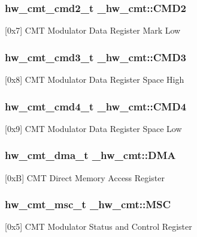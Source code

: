 \subsubsection[{\texorpdfstring{C\+M\+D2}{CMD2}}]{ {\bf hw\+\_\+cmt\+\_\+cmd2\+\_\+t} \+\_\+hw\+\_\+cmt\+::\+C\+M\+D2}\hypertarget{struct__hw__cmt_a62189149c37f1deebfa7ad2a13a26481}{}\label{struct__hw__cmt_a62189149c37f1deebfa7ad2a13a26481}
\mbox{[}0x7\mbox{]} C\+MT Modulator Data Register Mark Low 
\subsubsection[{\texorpdfstring{C\+M\+D3}{CMD3}}]{ {\bf hw\+\_\+cmt\+\_\+cmd3\+\_\+t} \+\_\+hw\+\_\+cmt\+::\+C\+M\+D3}\hypertarget{struct__hw__cmt_a4324a010f7ffa26fe66ba466ee0d5f37}{}\label{struct__hw__cmt_a4324a010f7ffa26fe66ba466ee0d5f37}
\mbox{[}0x8\mbox{]} C\+MT Modulator Data Register Space High 
\subsubsection[{\texorpdfstring{C\+M\+D4}{CMD4}}]{ {\bf hw\+\_\+cmt\+\_\+cmd4\+\_\+t} \+\_\+hw\+\_\+cmt\+::\+C\+M\+D4}\hypertarget{struct__hw__cmt_a6c23c669eb5c92baf42d5563c3c5f5c0}{}\label{struct__hw__cmt_a6c23c669eb5c92baf42d5563c3c5f5c0}
\mbox{[}0x9\mbox{]} C\+MT Modulator Data Register Space Low 
\subsubsection[{\texorpdfstring{D\+MA}{DMA}}]{ {\bf hw\+\_\+cmt\+\_\+dma\+\_\+t} \+\_\+hw\+\_\+cmt\+::\+D\+MA}\hypertarget{struct__hw__cmt_a81329518ec161cac7fa25849729403f5}{}\label{struct__hw__cmt_a81329518ec161cac7fa25849729403f5}
\mbox{[}0xB\mbox{]} C\+MT Direct Memory Access Register 
\subsubsection[{\texorpdfstring{M\+SC}{MSC}}]{ {\bf hw\+\_\+cmt\+\_\+msc\+\_\+t} \+\_\+hw\+\_\+cmt\+::\+M\+SC}\hypertarget{struct__hw__cmt_ada00f667a324781250373a8fce1f4c85}{}\label{struct__hw__cmt_ada00f667a324781250373a8fce1f4c85}
\mbox{[}0x5\mbox{]} C\+MT Modulator Status and Control Register 
